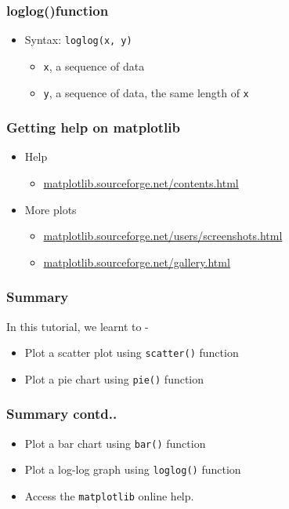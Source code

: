 \documentclass[17pt,compress]{beamer}
\begin{document}
\begin{frame}[fragile]
\frametitle{loglog()function}
\label{sec-18}
\begin{itemize}
\item Syntax: \texttt{loglog(x, y)}\pause
\begin{itemize}
\item \texttt{x}, a sequence of data\pause
\item \texttt{y}, a sequence of data, the same length of \texttt{x}
\end{itemize}
\end{itemize}
\end{frame}
\begin{frame}
\frametitle{Getting help on matplotlib}
\label{sec-19}
\begin{itemize}
\item Help
	\begin{itemize}
	\item \url{matplotlib.sourceforge.net/contents.html}\pause
	\end{itemize}
\item More plots
	\begin{itemize}
	\item \url{matplotlib.sourceforge.net/users/screenshots.html}\pause
	\item \url{matplotlib.sourceforge.net/gallery.html}
	\end{itemize}
\end{itemize}
\end{frame}
\begin{frame}
\frametitle{Summary}
\label{sec-20}
In this tutorial, we learnt to -
\begin{itemize}
\item Plot a scatter plot using \texttt{scatter()} function
\item Plot a pie chart using \texttt{pie()} function
\end{itemize}
\end{frame}
\begin{frame}
\frametitle{Summary contd..}
\label{sec-20}
\begin{itemize}
\item Plot a bar chart using \texttt{bar()} function
\item Plot a log-log graph using \texttt{loglog()} function
\item Access the \texttt{matplotlib} online help.
\end{itemize}
\end{frame}
\end{document}
